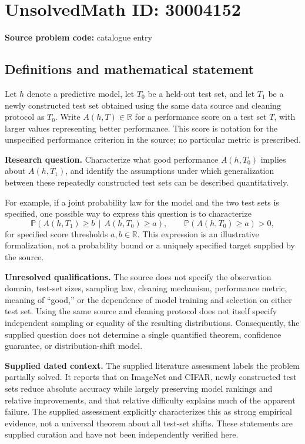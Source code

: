 \documentclass[11pt]{article}
\newcommand{\R}{\mathbb{R}}
\begin{document}
\section*{UnsolvedMath ID: 30004152}
\textbf{Source problem code:} catalogue entry
\subsection{Definitions and mathematical statement}
Let \(h\) denote a predictive model, let \(T_0\) be a held-out test set, and let \(T_1\) be a newly constructed test set obtained using the same data source and cleaning protocol as \(T_0\). Write \(A(h,T)\in\R\) for a performance score on a test set \(T\), with larger values representing better performance. This score is notation for the unspecified performance criterion in the source; no particular metric is prescribed.

\textbf{Research question.} Characterize what good performance \(A(h,T_0)\) implies about \(A(h,T_1)\), and identify the assumptions under which generalization between these repeatedly constructed test sets can be described quantitatively.

For example, if a joint probability law for the model and the two test sets is specified, one possible way to express this question is to characterize
\[
\mathbb{P}\!\left(A(h,T_1)\geq b\,\middle|\,A(h,T_0)\geq a\right),
\qquad
\mathbb{P}\!\left(A(h,T_0)\geq a\right)>0,
\]
for specified score thresholds \(a,b\in\R\). This expression is an illustrative formalization, not a probability bound or a uniquely specified target supplied by the source.

\textbf{Unresolved qualifications.} The source does not specify the observation domain, test-set sizes, sampling law, cleaning mechanism, performance metric, meaning of ``good,'' or the dependence of model training and selection on either test set. Using the same source and cleaning protocol does not itself specify independent sampling or equality of the resulting distributions. Consequently, the supplied question does not determine a single quantified theorem, confidence guarantee, or distribution-shift model.

\textbf{Supplied dated context.} The supplied literature assessment labels the problem partially solved. It reports that on ImageNet and CIFAR, newly constructed test sets reduce absolute accuracy while largely preserving model rankings and relative improvements, and that relative difficulty explains much of the apparent failure. The supplied assessment explicitly characterizes this as strong empirical evidence, not a universal theorem about all test-set shifts. These statements are supplied curation and have not been independently verified here.
\end{document}
